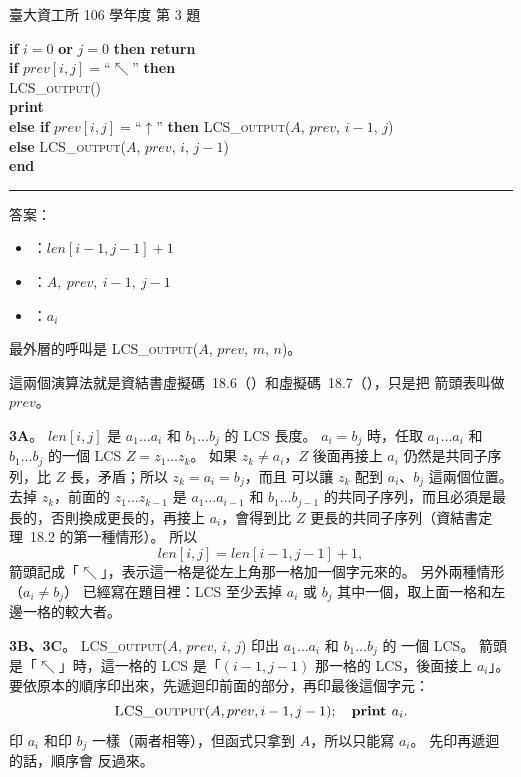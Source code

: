 \begin{pastexam}[label={px:ntu-106-dsa-03}]{臺大資工所 106 學年度 第 3 題}
\begin{tabbing}
\>\textbf{if} $i=0$ \textbf{or} $j=0$ \textbf{then return}\\
\>\textbf{if} $prev[i,j]=$``$\nwarrow$'' \textbf{then}\\
\>\>\textsc{LCS\_output}()\\
\>\>\textbf{print} \\
\>\textbf{else if} $prev[i,j]=$``$\uparrow$'' \textbf{then} \textsc{LCS\_output}($A$, $prev$, $i-1$, $j$)\\
\>\textbf{else} \textsc{LCS\_output}($A$, $prev$, $i$, $j-1$)\\
\textbf{end}
\end{tabbing}
\vspace{-0.8em}
\noindent\rule{\linewidth}{0.4pt}
\end{pastexam}

\begin{pastsoln}
答案：
\begin{itemize}
\item {}：$len[i-1, j-1] + 1$
\item {}：$A,\ prev,\ i-1,\ j-1$
\item {}：$a_i$
\end{itemize}
最外層的呼叫是 \textsc{LCS\_output}($A$, $prev$, $m$, $n$)。

這兩個演算法就是資結書虛擬碼~18.6（）和虛擬碼~18.7（），只是把
箭頭表叫做 $prev$。

\textbf{3A}。 $len[i, j]$ 是 $a_1 \ldots a_i$ 和 $b_1 \ldots b_j$ 的 LCS 長度。 $a_i = b_j$ 時，任取 $a_1 \ldots a_i$ 和 $b_1 \ldots b_j$ 的一個 LCS $Z = z_1 \ldots z_k$。 如果
$z_k \ne a_i$，$Z$ 後面再接上 $a_i$ 仍然是共同子序列，比 $Z$ 長，矛盾；所以 $z_k = a_i = b_j$，而且
可以讓 $z_k$ 配到 $a_i$、$b_j$ 這兩個位置。 去掉 $z_k$，前面的 $z_1 \ldots z_{k-1}$ 是 $a_1 \ldots a_{i-1}$
和 $b_1 \ldots b_{j-1}$ 的共同子序列，而且必須是最長的，否則換成更長的，再接上 $a_i$，會得到比 $Z$
更長的共同子序列（資結書定理~18.2 的第一種情形）。 所以
\[
len[i, j] = len[i-1, j-1] + 1 ,
\]
箭頭記成「$\nwarrow$」，表示這一格是從左上角那一格加一個字元來的。 另外兩種情形（$a_i \ne b_j$）
已經寫在題目裡：LCS 至少丟掉 $a_i$ 或 $b_j$ 其中一個，取上面一格和左邊一格的較大者。

\textbf{3B、3C}。 \textsc{LCS\_output}($A$, $prev$, $i$, $j$) 印出 $a_1 \ldots a_i$ 和 $b_1 \ldots b_j$ 的
一個 LCS。 箭頭是「$\nwarrow$」時，這一格的 LCS 是「$(i-1, j-1)$ 那一格的 LCS，後面接上
$a_i$」。 要依原本的順序印出來，先遞迴印前面的部分，再印最後這個字元：
\[
\textsc{LCS\_output}(A, prev, i-1, j-1); \quad \textbf{print } a_i .
\]
印 $a_i$ 和印 $b_j$ 一樣（兩者相等），但函式只拿到 $A$，所以只能寫 $a_i$。 先印再遞迴的話，順序會
反過來。


\end{pastsoln}
